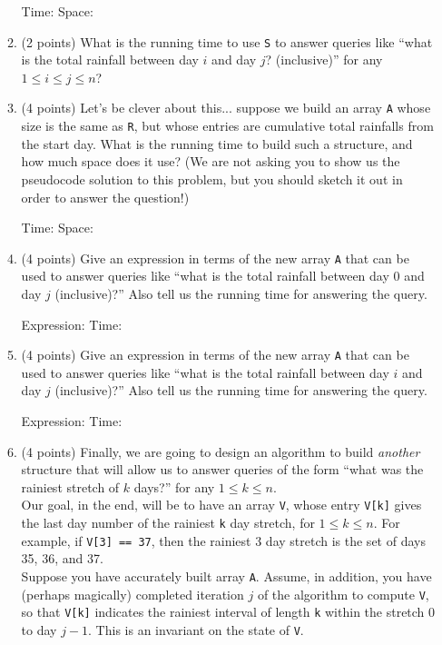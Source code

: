 \documentclass[11pt]{article}
\newcommand{\fillinlarge}[1]{\fbox{\LARGE{\textbf{#1}}}}
\newcommand{\fillinsmall}[1]{\fbox{\text{#1}}}
\begin{document}
\begin{enumerate}
\begin{enumerate}
Time: \fillinlarge{$n^3$} Space: \fillinlarge{$n^2$}
\item (2 points) What is the running time to use {\tt S} to answer queries like ``what is the total rainfall between day $i$ and day $j$? (inclusive)'' for any $1 \leq i \leq j\leq n$?

\fillinlarge{O(1)}

\item (4 points) Let's be clever about this... suppose we build an array {\tt A} whose size is the same as {\tt R}, but whose entries are cumulative total rainfalls from the start day. What is the running time to build such a structure, and how much space does it use? (We are not asking you to show us the pseudocode solution to this problem, but you should sketch it out in order to answer the question!)

Time: \fillinlarge{O(1)} Space: \fillinlarge{n}

\item (4 points) Give an expression in terms of the new array {\tt A} that can be used to answer queries like ``what is the total rainfall between day $0$ and day $j$ (inclusive)?'' Also tell us the running time for answering the query.

Expression: \fillinsmall{$A[j]$} Time: \fillinlarge{O(1)}

\item (4 points) Give an expression in terms of the new array {\tt A} that can be used to answer queries like ``what is the total rainfall between day $i$ and day $j$ (inclusive)?'' Also tell us the running time for answering the query.

Expression: \fillinsmall{$A[j] - A[i - 1]$} Time: \fillinsmall{O(1)}

\item (4 points) Finally, we are going to design an algorithm to build {\em another} structure that will allow us to answer queries of the form ``what was the rainiest stretch of $k$ days?'' for any $1\leq k\leq n$.\\

Our goal, in the end, will be to have an array {\tt V}, whose entry {\tt V[k]} gives the last day number of the rainiest {\tt k} day stretch, for $1\leq k\leq n$. For example, if {\tt V[3] == 37}, then the rainiest 3 day stretch is the set of days 35, 36, and 37. \\

Suppose you have accurately built array {\tt A}. Assume, in addition, you have (perhaps magically) completed iteration $j$ of the algorithm to compute {\tt V}, so that {\tt V[k]} indicates the rainiest interval of length {\tt k} within the stretch 0 to day $j-1$. This is an invariant on the state of {\tt V}.\\


\end{enumerate}
\end{enumerate}
\end{document}
